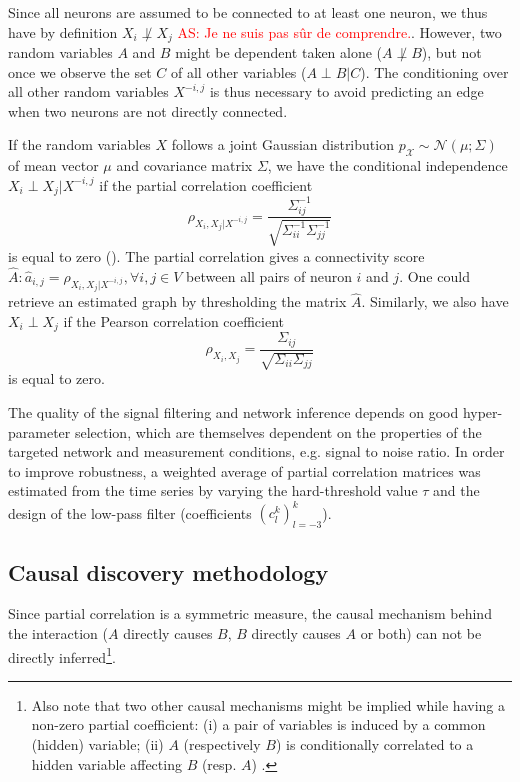 \documentclass[wcp]{jmlr}
\begin{document}
Since all neurons are assumed to be connected to at least one neuron, we thus
have by definition $X_i \not\perp X_j$ \textcolor{red}{AS: Je ne suis pas sûr
de comprendre.}. However,  two random variables $A$ and $B$ might be
dependent taken alone ($A \not\perp B$), but not once we observe the set  $C$
of all other variables ($A \perp B | C$). The conditioning over all other
random variables $X^{-i,j}$ is thus necessary to avoid predicting an edge when
two neurons are not directly connected.

If the random variables $X$ follows a joint Gaussian distribution
$p_\mathcal{X} \sim \mathcal{N}(\mu; \Sigma)$ of mean vector $\mu$ and
covariance matrix $\Sigma$, we have the conditional independence
$X_i \perp X_j | X^{-i,j}$ if the partial correlation coefficient
\[
\rho_{X_i, X_j | X^{-i,j}}
= \frac{\Sigma^{-1}_{ij}}{\sqrt{\Sigma^{-1}_{ii} \Sigma^{-1}_{jj}}}
\]
is equal to zero (\cite{koller2009probabilistic}). The partial correlation gives
a connectivity score
$\hat{A}: \hat{a}_{i,j} = \rho_{X_i, X_j | X^{-i,j}}, \forall i, j \in V$ between all
pairs of neuron $i$ and $j$. One could retrieve an estimated graph by thresholding
the matrix $\hat{A}$.
Similarly, we also have $X_i \perp X_j$ if the Pearson correlation
coefficient
\[
\rho_{X_i,X_j} = \frac{\Sigma_{ij}}{\sqrt{\Sigma_{ii}
\Sigma_{jj}}}
\]
is equal to zero.

The quality of the signal filtering and network inference depends on
good hyper-parameter selection, which are themselves dependent on the properties
of the targeted network and measurement conditions, e.g. signal to noise ratio.
In order to improve robustness, a weighted average of partial correlation
matrices was estimated from the time series by varying the hard-threshold value
$\tau$ and the design of the low-pass filter (coefficients $(c_l^k)_{l=-3}^k$).



\subsection{Causal discovery methodology}
Since partial correlation is a symmetric measure, the causal mechanism behind the
interaction ($A$ directly causes $B$, $B$ directly causes $A$ or both) can not
be directly inferred\footnote{Also note that two other causal mechanisms might be
implied while having a non-zero partial coefficient: (i) a pair of variables
is induced by a common (hidden) variable; (ii) $A$ (respectively $B$) is
conditionally correlated to a hidden variable affecting $B$ (resp. $A$)
\cite{de2004discovery}.}.
\end{document}
